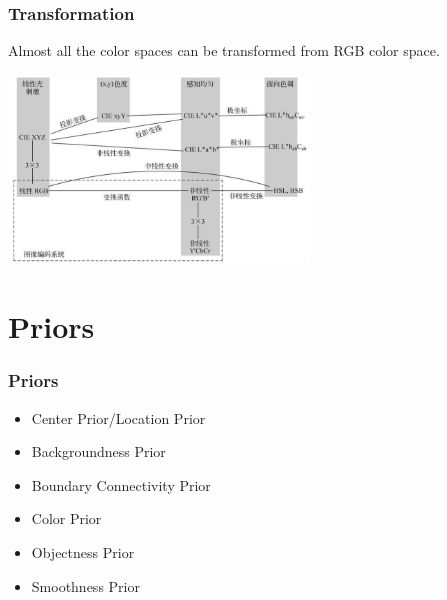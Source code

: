 \documentclass[notheorems,serif,table,compress]{beamer}  %
\begin{document}
\begin{frame}
\frametitle{Transformation}
Almost all the color spaces can be transformed from RGB color space.

\centering\includegraphics[width=8cm]{ColorSpaceTransform}
\end{frame}


\section{Priors}

\begin{frame}
\frametitle{Priors}
\begin{itemize}
\item Center Prior/Location Prior
\item Backgroundness Prior
\item Boundary Connectivity Prior
\item Color Prior
\item Objectness Prior
\item Smoothness Prior
\end{itemize}
\end{frame}
\end{document}
